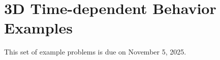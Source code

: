 \section{3D Time-dependent Behavior Examples}
\label{PS4}

This set of example problems is due on November 5, 2025. 

